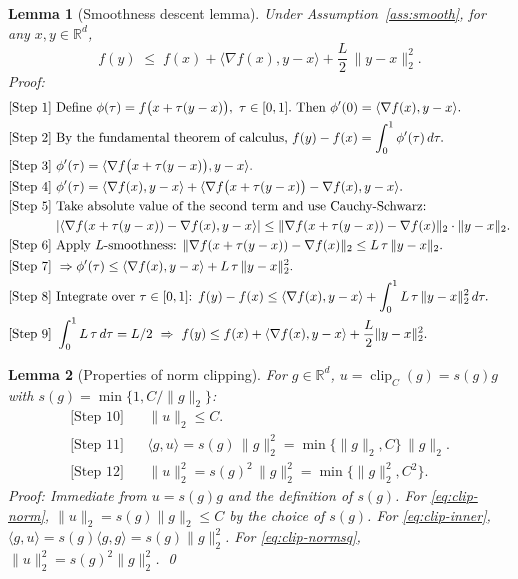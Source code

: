 \documentclass[11pt]{article}
\newtheorem{lemma}{Lemma}
\newcommand{\R}{\mathbb{R}}
\begin{document}
\begin{lemma}[Smoothness descent lemma]
\label{lem:smooth}
Under Assumption~\ref{ass:smooth}, for any $x,y\in\R^d$,
\[
f(y) \;\le\; f(x) + \langle \nabla f(x), y-x\rangle + \frac{L}{2}\,\|y-x\|_2^2.
\]
Proof:
\begin{align*}
\text{[Step 1]}&\ \text{Define }\phi(\tau)=f\big(x+\tau(y-x)\big),\ \tau\in[0,1].\ \text{Then } \phi'(0)=\langle \nabla f(x), y-x\rangle.\\
\text{[Step 2]}&\ \text{By the fundamental theorem of calculus, } f(y)-f(x)=\int_0^1 \phi'(\tau)\,d\tau.\\
\text{[Step 3]}&\ \phi'(\tau) = \langle \nabla f\big(x+\tau(y-x)\big), y-x\rangle.\\
\text{[Step 4]}&\ \phi'(\tau) = \langle \nabla f(x), y-x\rangle + \langle \nabla f\big(x+\tau(y-x)\big)-\nabla f(x), y-x\rangle.\\
\text{[Step 5]}&\ \text{Take absolute value of the second term and use Cauchy-Schwarz: }\\
&\ |\langle \nabla f(x+\tau(y-x))-\nabla f(x), y-x\rangle|
\le \|\nabla f(x+\tau(y-x))-\nabla f(x)\|_2 \cdot \|y-x\|_2.\\
\text{[Step 6]}&\ \text{Apply $L$-smoothness: } \|\nabla f(x+\tau(y-x))-\nabla f(x)\|_2 \le L\,\tau\,\|y-x\|_2.\\
\text{[Step 7]}&\ \Rightarrow \phi'(\tau) \le \langle \nabla f(x), y-x\rangle + L\,\tau\,\|y-x\|_2^2.\\
\text{[Step 8]}&\ \text{Integrate over $\tau\in[0,1]$: } f(y)-f(x) \le \langle \nabla f(x), y-x\rangle + \int_0^1 L\,\tau\,\|y-x\|_2^2\, d\tau.\\
\text{[Step 9]}&\ \int_0^1 L\,\tau\, d\tau = L/2 \ \Rightarrow\ f(y)\le f(x) + \langle \nabla f(x), y-x\rangle + \frac{L}{2}\|y-x\|_2^2.\qedhere
\end{align*}
\end{lemma}

\begin{lemma}[Properties of norm clipping]
\label{lem:clip}
For $g\in\R^d$, $u=\operatorname{clip}_C(g)=s(g)g$ with $s(g)=\min\{1, C/\|g\|_2\}$:
\begin{align}
\text{[Step 10]}&\ \ \ \ \|u\|_2 \le C. \label{eq:clip-norm}\\
\text{[Step 11]}&\ \ \ \ \langle g, u \rangle = s(g)\,\|g\|_2^2 = \min\{\|g\|_2, C\}\,\|g\|_2. \label{eq:clip-inner}\\
\text{[Step 12]}&\ \ \ \ \|u\|_2^2 = s(g)^2\,\|g\|_2^2 = \min\{\|g\|_2^2, C^2\}. \label{eq:clip-normsq}
\end{align}
Proof: Immediate from $u=s(g)g$ and the definition of $s(g)$. For \eqref{eq:clip-norm}, $\|u\|_2=s(g)\|g\|_2\le C$ by the choice of $s(g)$. For \eqref{eq:clip-inner}, $\langle g,u\rangle = s(g)\langle g,g\rangle=s(g)\|g\|_2^2$. For \eqref{eq:clip-normsq}, $\|u\|_2^2=s(g)^2\|g\|_2^2$. \qed
\end{lemma}
\end{document}
